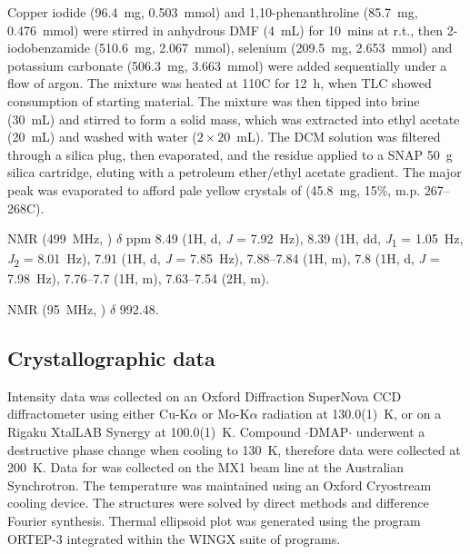 \begin{refsection}
    Copper iodide (96.4~mg, 0.503~mmol) and 1,10-phenanthroline (85.7~mg, 0.476~mmol) were stirred in anhydrous DMF (4~mL) for 10~mins at r.t., then 2-iodobenzamide (510.6~mg, 2.067~mmol), selenium (209.5~mg, 2.653~mmol) and potassium carbonate (506.3~mg, 3.663~mmol) were added sequentially under a flow of argon.
    The mixture was heated at 110\degree{}C for 12~h, when TLC showed consumption of starting material.
    The mixture was then tipped into brine (30~mL) and stirred to form a solid mass, which was extracted into ethyl acetate (20~mL) and washed with water ($ 2 \times 20 $~mL).
    The DCM solution was filtered through a silica plug, then evaporated, and the residue applied to a SNAP 50~g silica cartridge, eluting with a petroleum ether/ethyl acetate gradient.
    The major peak was evaporated to afford pale yellow crystals of  (45.8~mg, 15\%, m.p. 267--268\degree{}C). 
    
     NMR (499~MHz, ) $\delta$ ppm 8.49 (1H, d, \textit{J} = 7.92~Hz), 8.39 (1H, dd, \textit{J}\textsubscript{1} = 1.05~Hz, \textit{J}\textsubscript{2} = 8.01~Hz), 7.91 (1H, d, \textit{J} = 7.85~Hz), 7.88--7.84 (1H, m), 7.8 (1H, d, \textit{J} = 7.98~Hz), 7.76--7.7 (1H, m), 7.63--7.54 (2H, m).
    
     NMR (95~MHz, ) $ \delta $ 992.48.
    
    \subsection{Crystallographic data}\label{sec:ch3-si}
    Intensity data was collected on an Oxford Diffraction SuperNova CCD diffractometer using either Cu-K$\alpha$ or Mo-K$\alpha$ radiation at 130.0(1)~K, or on a Rigaku XtalLAB Synergy at 100.0(1)~K. Compound $ \cdot $DMAP$ \cdot $ underwent a destructive phase change when cooling to 130~K, therefore data were collected at 200~K. Data for  was collected on the MX1 beam line at the Australian Synchrotron\autocite{Cowieson2015}. The temperature was maintained using an Oxford Cryostream cooling device. The structures were solved by direct methods and difference Fourier synthesis.\autocite{Sheldrick2015} Thermal ellipsoid plot was generated using the program ORTEP-3\autocite{Farrugia1997} integrated within the WINGX\autocite{Farrugia1999} suite of programs.
    

\end{refsection}
